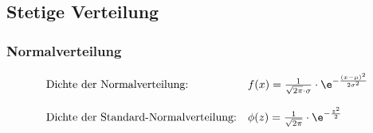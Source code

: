 \subsection{Stetige Verteilung}

\subsubsection{Normalverteilung}
\begin{align*}
\begin{array}{ll}
\mbox{Dichte der Normalverteilung:} & f(x) = \frac{1}{\sqrt{2 \pi} \cdot \sigma} \cdot \e^{- \frac{(x-\mu)^2}{2 \sigma^2}}\\
{} & {} \\
\mbox{Dichte der Standard-Normalverteilung:} & \phi(z) = \frac{1}{\sqrt{2 \pi}} \cdot \e^{- \frac{z^2}{2}}\\
\end{array}
\end{align*}

